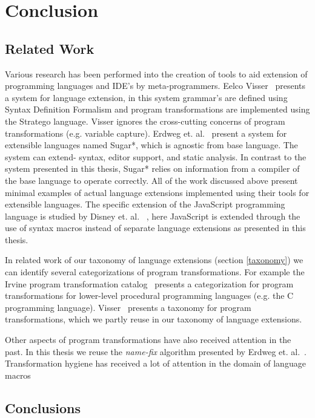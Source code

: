 
\chapter{Conclusion} %

\label{Chapter5} %


\section{Related Work}
Various research has been performed into the creation of tools to aid extension of programming languages and IDE's by meta-programmers. Eelco Visser~\cite{Visser20024} presents a system for language extension, in this system grammar's are defined using Syntax Definition Formalism and program transformations are implemented using the Stratego language. Visser ignores the cross-cutting concerns of program transformations (e.g. variable capture). Erdweg et. al.~\cite{Erdweg} present a system for extensible languages named Sugar*, which is agnostic from base language. The system can extend- syntax, editor support, and static analysis. In contrast to the system presented in this thesis, Sugar* relies on information from a compiler of the base language to operate correctly.
All of the work discussed above present minimal examples of actual language extensions implemented using their tools for extensible languages. The specific extension of the JavaScript programming language is studied by Disney et. al. ~\cite{Disney2014}, here JavaScript is extended through the use of syntax macros instead of separate language extensions as presented in this thesis.

In related work of our taxonomy of language extensions (section \ref{taxonomy}) we can identify several categorizations of program transformations. For example the Irvine program transformation catalog~\cite{Standish1976a} presents a categorization for program transformations for lower-level procedural programming languages (e.g. the C programming language). Visser~\cite{Visser2001} presents a taxonomy for program transformations, which we partly reuse in our taxonomy of language extensions.

Other aspects of program transformations have also received attention in the past. In this thesis we reuse the \textit{name-fix} algorithm presented by Erdweg et. al.~\cite{Erdweg2014}. Transformation hygiene has received a lot of attention in the domain of language macros~\cite{Kohlbecker1986,Herman2010a,Disney2014}

\section{Conclusions}
